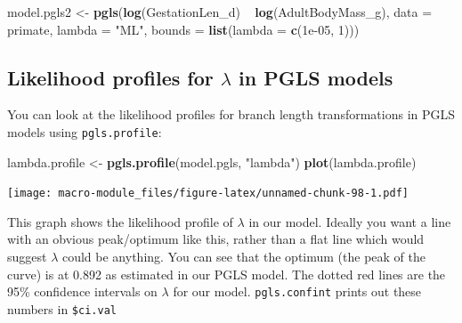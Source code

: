 \documentclass[]{book}
\newenvironment{Shaded}{\begin{snugshade}}{\end{snugshade}}
\newcommand{\KeywordTok}[1]{\textcolor[rgb]{0.13,0.29,0.53}{\textbf{{#1}}}}
\newcommand{\DataTypeTok}[1]{\textcolor[rgb]{0.13,0.29,0.53}{{#1}}}
\newcommand{\DecValTok}[1]{\textcolor[rgb]{0.00,0.00,0.81}{{#1}}}
\newcommand{\FloatTok}[1]{\textcolor[rgb]{0.00,0.00,0.81}{{#1}}}
\newcommand{\StringTok}[1]{\textcolor[rgb]{0.31,0.60,0.02}{{#1}}}
\newcommand{\NormalTok}[1]{{#1}}
\theoremstyle{definition}
\theoremstyle{definition}
\theoremstyle{definition}
\theoremstyle{remark}
\begin{document}
\begin{Shaded}
\begin{Highlighting}[]
\NormalTok{model.pgls2 <-}\StringTok{ }\KeywordTok{pgls}\NormalTok{(}\KeywordTok{log}\NormalTok{(GestationLen_d) ~}\StringTok{ }\KeywordTok{log}\NormalTok{(AdultBodyMass_g), }\DataTypeTok{data =} \NormalTok{primate,}
                    \DataTypeTok{lambda =} \StringTok{"ML"}\NormalTok{, }\DataTypeTok{bounds =} \KeywordTok{list}\NormalTok{(}\DataTypeTok{lambda =} \KeywordTok{c}\NormalTok{(}\FloatTok{1e-05}\NormalTok{, }\DecValTok{1}\NormalTok{)))}
\end{Highlighting}
\end{Shaded}

\subsection{\texorpdfstring{Likelihood profiles for \(\lambda\) in PGLS
models}{Likelihood profiles for \textbackslash{}lambda in PGLS models}}\label{likelihood-profiles-for-lambda-in-pgls-models}

You can look at the likelihood profiles for branch length
transformations in PGLS models using \texttt{pgls.profile}:

\begin{Shaded}
\begin{Highlighting}[]
\NormalTok{lambda.profile <-}\StringTok{ }\KeywordTok{pgls.profile}\NormalTok{(model.pgls, }\StringTok{"lambda"}\NormalTok{)}
\KeywordTok{plot}\NormalTok{(lambda.profile)}
\end{Highlighting}
\end{Shaded}

\texttt{[image: macro-module\_files/figure-latex/unnamed-chunk-98-1.pdf]}

This graph shows the likelihood profile of \(\lambda\) in our model.
Ideally you want a line with an obvious peak/optimum like this, rather
than a flat line which would suggest \(\lambda\) could be anything. You
can see that the optimum (the peak of the curve) is at 0.892 as
estimated in our PGLS model. The dotted red lines are the 95\%
confidence intervals on \(\lambda\) for our model. \texttt{pgls.confint}
prints out these numbers in \texttt{\$ci.val}

\begin{Shaded}
\end{Shaded}
\end{document}
